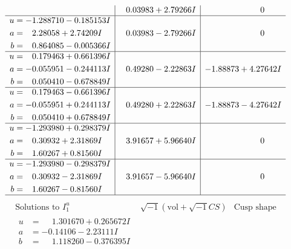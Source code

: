 \documentclass[1p]{elsarticle_modified}
\theoremstyle{definition}
\newcommand{\I}{\sqrt{-1}}
\begin{document}
$$\begin{array}{c|c|c}
 & \phantom{-}0.03983 + 2.79266 I & \phantom{-0.000000 } 0 \\ \hline\begin{aligned}
u &= -1.288710 - 0.185153 I \\
a &= \phantom{-}2.28058 + 2.74209 I \\
b &= \phantom{-}0.864085 - 0.005366 I\end{aligned}
 & \phantom{-}0.03983 - 2.79266 I & \phantom{-0.000000 } 0 \\ \hline\begin{aligned}
u &= \phantom{-}0.179463 + 0.661396 I \\
a &= -0.055951 - 0.244113 I \\
b &= \phantom{-}0.050410 - 0.678849 I\end{aligned}
 & \phantom{-}0.49280 - 2.22863 I & -1.88873 + 4.27642 I \\ \hline\begin{aligned}
u &= \phantom{-}0.179463 - 0.661396 I \\
a &= -0.055951 + 0.244113 I \\
b &= \phantom{-}0.050410 + 0.678849 I\end{aligned}
 & \phantom{-}0.49280 + 2.22863 I & -1.88873 - 4.27642 I \\ \hline\begin{aligned}
u &= -1.293980 + 0.298379 I \\
a &= \phantom{-}0.30932 + 2.31869 I \\
b &= \phantom{-}1.60267 + 0.81560 I\end{aligned}
 & \phantom{-}3.91657 + 5.96640 I & \phantom{-0.000000 } 0 \\ \hline\begin{aligned}
u &= -1.293980 - 0.298379 I \\
a &= \phantom{-}0.30932 - 2.31869 I \\
b &= \phantom{-}1.60267 - 0.81560 I\end{aligned}
 & \phantom{-}3.91657 - 5.96640 I & \phantom{-0.000000 } 0\\
 \hline 
 \end{array}$$\newpage$$\begin{array}{c|c|c}  
\text{Solutions to }I^u_{1}& \I (\text{vol} + \sqrt{-1}CS) & \text{Cusp shape}\\
 \hline 
\begin{aligned}
u &= \phantom{-}1.301670 + 0.265672 I \\
a &= -0.14106 - 2.23111 I \\
b &= \phantom{-}1.118260 - 0.376395 I\end{aligned}

\end{array}$$
\end{document}
